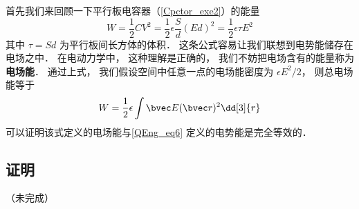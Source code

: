 
首先我们来回顾一下平行板电容器（\autoref{Cpctor_exe2}）的能量
\begin{equation}
W = \frac12 CV^2 = \frac12 \epsilon \frac Sd (Ed)^2 = \frac 12 \epsilon \tau E^2
\end{equation}
其中 $\tau = Sd$ 为平行板间长方体的体积． 这条公式容易让我们联想到电势能储存在电场之中． 在电动力学中， 这种理解是正确的， 我们不妨把电场含有的能量称为\textbf{电场能}． 通过上式， 我们假设空间中任意一点的电场能密度为 $\epsilon E^2/2$， 则总电场能等于
\begin{equation}
W = \frac12 \epsilon \int \bvec E(\bvec r)^2 \dd[3]{r}
\end{equation}
可以证明该式定义的电场能与\autoref{QEng_eq6} 定义的电势能是完全等效的．

\subsection{证明}
（未完成）